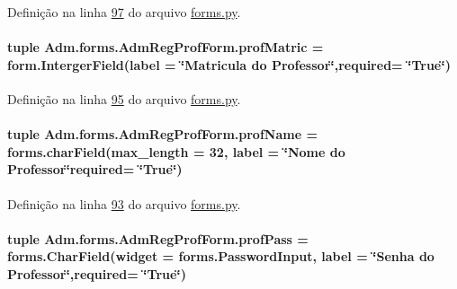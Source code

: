 Definição na linha \hyperlink{Adm_2forms_8py_source_l00097}{97} do arquivo \hyperlink{Adm_2forms_8py_source}{forms.\-py}.

\hypertarget{classAdm_1_1forms_1_1AdmRegProfForm_ac53b20321fbc980c896f534229c68ff1}{
\paragraph[{prof\-Matric}]{\setlength{\rightskip}{0pt plus 5cm}tuple Adm.\-forms.\-Adm\-Reg\-Prof\-Form.\-prof\-Matric = form.\-Interger\-Field(label = \char`\"{}Matricula do Professor\char`\"{},required= \char`\"{}True\char`\"{})\hspace{0.3cm}{\ttfamily [static]}}}\label{classAdm_1_1forms_1_1AdmRegProfForm_ac53b20321fbc980c896f534229c68ff1}


Definição na linha \hyperlink{Adm_2forms_8py_source_l00095}{95} do arquivo \hyperlink{Adm_2forms_8py_source}{forms.\-py}.

\hypertarget{classAdm_1_1forms_1_1AdmRegProfForm_aec9f5746e7eb7f389c0f159780dd71fa}{
\paragraph[{prof\-Name}]{\setlength{\rightskip}{0pt plus 5cm}tuple Adm.\-forms.\-Adm\-Reg\-Prof\-Form.\-prof\-Name = forms.\-char\-Field(max\-\_\-length = 32, label = \char`\"{}Nome do Professor\char`\"{}required= \char`\"{}True\char`\"{})\hspace{0.3cm}{\ttfamily [static]}}}\label{classAdm_1_1forms_1_1AdmRegProfForm_aec9f5746e7eb7f389c0f159780dd71fa}


Definição na linha \hyperlink{Adm_2forms_8py_source_l00093}{93} do arquivo \hyperlink{Adm_2forms_8py_source}{forms.\-py}.

\hypertarget{classAdm_1_1forms_1_1AdmRegProfForm_afe9e2e7368001ac81851ece8b42ccb57}{
\paragraph[{prof\-Pass}]{\setlength{\rightskip}{0pt plus 5cm}tuple Adm.\-forms.\-Adm\-Reg\-Prof\-Form.\-prof\-Pass = forms.\-Char\-Field(widget = forms.\-Password\-Input, label = \char`\"{}Senha do Professor\char`\"{},required= \char`\"{}True\char`\"{})\hspace{0.3cm}{\ttfamily [static]}}}\label{classAdm_1_1forms_1_1AdmRegProfForm_afe9e2e7368001ac81851ece8b42ccb57}


